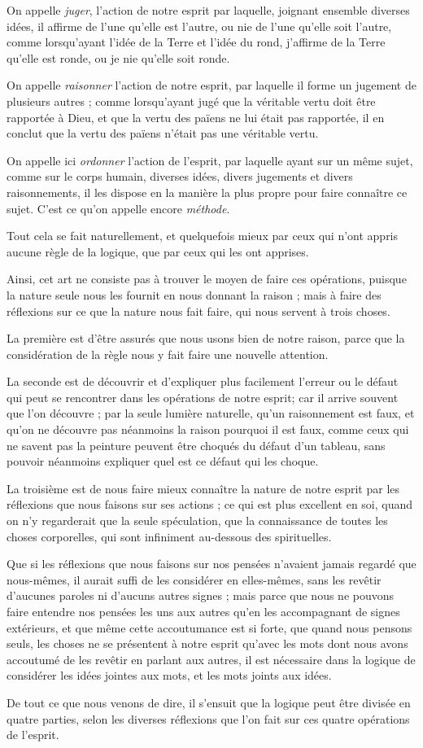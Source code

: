 On appelle \emph{juger}, l'action de notre esprit par laquelle, joignant ensemble diverses idées, il affirme de l'une qu'elle est l'autre, ou nie de l'une qu'elle soit l'autre, comme lorsqu'ayant l'idée de la Terre et l'idée du rond, j'affirme de la Terre qu'elle est ronde, ou je nie qu'elle soit ronde.

On appelle \emph{raisonner} l'action de notre esprit, par laquelle il forme un jugement de plusieurs autres ; comme lorsqu'ayant jugé que la véritable vertu doit être rapportée à Dieu, et que la vertu des païens ne lui était pas rapportée, il en conclut que la vertu des païens n'était pas une véritable vertu.

On appelle ici \emph{ordonner} l'action de l'esprit, par laquelle ayant sur un même sujet, comme sur le corps humain, diverses idées, divers jugements et divers raisonnements, il les dispose en la manière la plus propre pour faire connaître ce sujet. C'est ce qu'on appelle encore \emph{méthode}.

Tout cela se fait naturellement, et quelquefois mieux par ceux qui n'ont appris aucune règle de la logique, que par ceux qui les ont apprises.

Ainsi, cet art ne consiste pas à trouver le moyen de faire ces opérations, puisque la nature seule nous les fournit en nous donnant la raison ; mais à faire des réflexions sur ce que la nature nous fait faire, qui nous servent à trois choses.

La première est d'être assurés que nous usons bien de notre raison, parce que la considération de la règle nous y fait faire une nouvelle attention.

La seconde est de découvrir et d'expliquer plus facilement l'erreur ou le défaut qui peut se rencontrer dans les opérations de notre esprit; car il arrive souvent que l'on découvre ; par la seule lumière naturelle, qu'un raisonnement est faux, et qu'on ne découvre pas néanmoins la raison pourquoi il est faux, comme ceux qui ne savent pas la peinture peuvent être choqués du défaut d'un tableau, sans pouvoir néanmoins expliquer quel est ce défaut qui les choque.

La troisième est de nous faire mieux connaître la nature de notre esprit par les réflexions que nous faisons sur ses actions ; ce qui est plus excellent en soi, quand on n'y regarderait que la seule spéculation, que la connaissance de toutes les choses corporelles, qui sont infiniment au-dessous des spirituelles.

Que si les réflexions que nous faisons sur nos pensées n'avaient jamais regardé que nous-mêmes, il aurait suffi de les considérer en elles-mêmes, sans les revêtir d'aucunes paroles ni d'aucuns autres signes ; mais parce que nous ne pouvons faire entendre nos pensées les uns aux autres qu'en les accompagnant de signes extérieurs, et que même cette accoutumance est si forte, que quand nous pensons seuls, les choses ne se présentent à notre esprit qu'avec les mots dont nous avons accoutumé de les revêtir en parlant aux autres, il est nécessaire dans la logique de considérer les idées jointes aux mots, et les mots joints aux idées.

De tout ce que nous venons de dire, il s'ensuit que la logique peut être divisée en quatre parties, selon les diverses réflexions que l'on fait sur ces quatre opérations de l'esprit.

